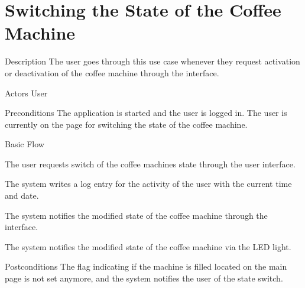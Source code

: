 \section{Switching the State of the Coffee Machine}

\begin{cpart}{Description}
The user goes through this use case whenever they request activation or deactivation of the coffee machine through the interface.
\end{cpart}

\begin{cpart}{Actors}
User
\end{cpart}

\begin{cpart}{Preconditions}
The application is started and the user is logged in. The user is currently on the page for switching the state of the coffee machine.
\end{cpart}

\begin{cpartList}{Basic Flow}
  \item The user requests switch of the coffee machines state through the user interface.
  \item The system writes a log entry for the activity of the user with the current time and date.
  \item The system notifies the modified state of the coffee machine through the interface.
  \item The system notifies the modified state of the coffee machine via the LED light.
\end{cpartList}

\begin{cpart}{Postconditions}
The flag indicating if the machine is filled located on the main page is not set anymore, and the system notifies the user of the state switch.
\end{cpart}

